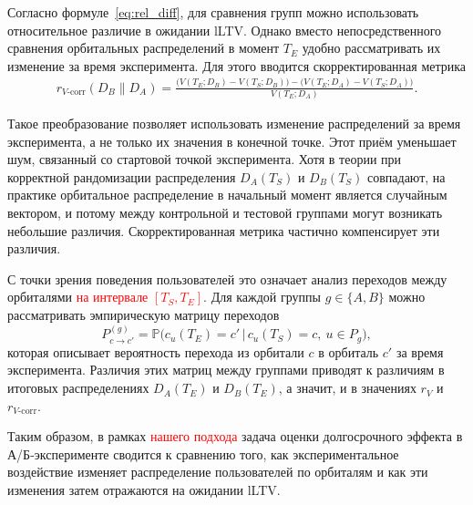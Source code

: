 Согласно формуле~\eqref{eq:rel_diff}, для сравнения групп можно
использовать относительное различие в ожидании lLTV. Однако вместо
непосредственного сравнения орбитальных распределений в момент $T_E$
удобно рассматривать их изменение за время эксперимента. Для этого
вводится скорректированная метрика
\begin{equation}
\label{eq:rel_diff_corrected}
\begin{split}
r_{V\text{-corr}}(D_B \parallel D_A)
=
\frac{\big(V(T_E; D_B) - V(T_S; D_B)\big)
-
\big(V(T_E; D_A) - V(T_S; D_A)\big)}
{V(T_E; D_A)}.
\end{split}
\end{equation}

Такое преобразование позволяет использовать изменение распределений
за время эксперимента, а не только их значения в конечной точке. Этот
приём уменьшает шум, связанный со стартовой точкой эксперимента. Хотя
в теории при корректной рандомизации распределения $D_A(T_S)$ и
$D_B(T_S)$ совпадают, на практике орбитальное распределение в начальный
момент является случайным вектором, и потому между контрольной и
тестовой группами могут возникать небольшие различия. Скорректированная
метрика частично компенсирует эти различия.

С точки зрения поведения пользователей это означает анализ переходов
между орбиталями \textcolor{red}{на интервале $[T_S, T_E]$}. Для каждой группы
$g \in \{A,B\}$ можно рассматривать эмпирическую матрицу переходов
\[
  P^{(g)}_{c \to c'} =
  \mathbb{P}\big( c_u(T_E) = c' \,\big|\, c_u(T_S) = c,\ u \in P_g \big),
\]
которая описывает вероятность перехода из орбитали $c$ в орбиталь $c'$
за время эксперимента. Различия этих матриц между группами приводят
к различиям в итоговых распределениях $D_A(T_E)$ и $D_B(T_E)$, а значит,
и в значениях $r_V$ и $r_{V\text{-corr}}$.

Таким образом, в рамках \textcolor{red}{нашего подхода} задача оценки долгосрочного
эффекта в А/Б-эксперименте сводится к сравнению того, как экспериментальное
воздействие изменяет распределение пользователей по орбиталям и как эти
изменения затем отражаются на ожидании lLTV.
